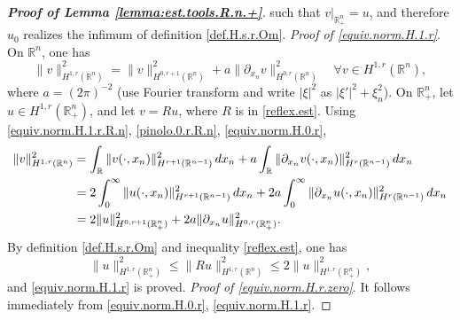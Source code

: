 \documentclass[10pt,reqno,a4paper]{article}
\numberwithin{equation}{section}
\theoremstyle{plain}
\theoremstyle{definition}
\newcommand{\R}{{\mathbb R}}
\newcommand{\pa}{\partial}
\begin{document}
\begin{proof}[\textbf{Proof of Lemma \ref{lemma:est.tools.R.n.+}}]
such that $v|_{\R^n_+} = u$, and therefore $u_0$ realizes the infimum of definition \eqref{def.H.s.r.Om}.
\emph{Proof of \eqref{equiv.norm.H.1.r}}. 
On $\R^n$, one has 
\begin{equation} \label{equiv.norm.H.1.r.R.n} 
\| v \|_{H^{1,r}(\R^n)}^2 
= \| v \|_{H^{0,r+1}(\R^n)}^2 + a \| \pa_{x_n} v \|_{H^{0,r}(\R^n)}^2 
\quad \forall v \in H^{1,r}(\R^n),
\end{equation}
where $a = (2\pi)^{-2}$  
(use Fourier transform and write $|\xi|^2$ as $|\xi'|^2 + \xi_n^2$).  
On $\R^n_+$, let $u \in H^{1,r}(\R^n_+)$, and let $v = Ru$, 
where $R$ is in \eqref{reflex.est}. 
Using \eqref{equiv.norm.H.1.r.R.n}, 
\eqref{pinolo.0.r.R.n}, 
\eqref{equiv.norm.H.0.r},  
\begin{align*}
\| v \|_{H^{1,r}(\R^n)}^2 
& = \int_\R \| v(\cdot, x_n) \|_{H^{r+1}(\R^{n-1})}^2 \, d x_n 
+ a \int_\R \| \pa_{x_n} v(\cdot, x_n) \|_{H^r(\R^{n-1})}^2 \, d x_n 
\notag \\ 
& = 2 \int_0^\infty \| u(\cdot, x_n) \|_{H^{r+1}(\R^{n-1})}^2 \, d x_n 
+ 2 a \int_0^\infty \| \pa_{x_n} u(\cdot, x_n) \|_{H^r(\R^{n-1})}^2 \, d x_n
\\ & = 2 \| u \|_{H^{0,r+1}(\R^n_+)}^2 
+ 2 a \| \pa_{x_n} u \|_{H^{0,r}(\R^n_+)}^2. 
\end{align*}
By definition \eqref{def.H.s.r.Om} and inequality \eqref{reflex.est}, one has  
\[
\| u \|_{H^{1,r}(\R^n_+)}^2 
\leq \| Ru \|_{H^{1,r}(\R^n)}^2
\leq 2 \| u \|_{H^{1,r}(\R^n_+)}^2,
\]
and \eqref{equiv.norm.H.1.r} is proved. 
\emph{Proof of \eqref{equiv.norm.H.r.zero}}. It follows immediately from 
\eqref{equiv.norm.H.0.r}, \eqref{equiv.norm.H.1.r}. 


\medskip


\end{proof}
\end{document}
